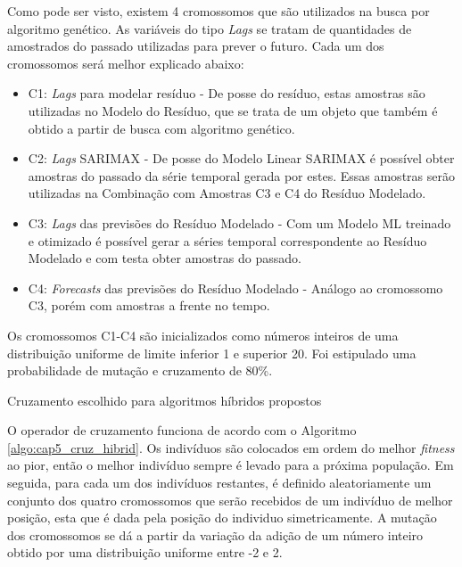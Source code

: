 Como pode ser visto, existem 4 cromossomos que são utilizados na busca por algoritmo genético. As variáveis do tipo \textit{Lags} se tratam de quantidades de amostrados do passado utilizadas para prever o futuro. Cada um dos cromossomos será melhor explicado abaixo:

\begin{itemize}
    \item C1: \textit{Lags} para modelar resíduo - De posse do resíduo, estas amostras são utilizadas no Modelo do Resíduo, que se trata de um objeto que também é obtido a partir de busca com algoritmo genético.
    
    \item C2: \textit{Lags} SARIMAX - De posse do Modelo Linear SARIMAX é possível obter amostras do passado da série temporal gerada por estes. Essas amostras serão utilizadas na Combinação com Amostras C3 e C4 do Resíduo Modelado.
    
    \item C3: \textit{Lags} das previsões do Resíduo Modelado - Com um Modelo ML treinado e otimizado é possível gerar a séries temporal correspondente ao Resíduo Modelado e com testa obter amostras do passado.
    
    \item C4: \textit{Forecasts} das previsões do Resíduo Modelado - Análogo ao cromossomo C3, porém com amostras a frente no tempo.
\end{itemize}

Os cromossomos C1-C4 são inicializados como números inteiros de uma distribuição uniforme de limite inferior 1 e superior 20. Foi estipulado uma probabilidade de mutação e cruzamento de 80\%.

\begin{algorithm}[!htp]
    \caption{Cruzamento escolhido para algoritmos híbridos propostos}
    \label{algo:cap5_cruz_hibrid}
\end{algorithm}

O operador de cruzamento funciona de acordo com o Algoritmo \ref{algo:cap5_cruz_hibrid}. Os indivíduos são colocados em ordem do melhor \textit{fitness} ao pior, então o melhor indivíduo sempre é levado para a próxima população. Em seguida, para cada um dos indivíduos restantes, é definido aleatoriamente um conjunto dos quatro cromossomos que serão recebidos de um indivíduo de melhor posição, esta que é dada pela posição do individuo simetricamente. A mutação dos cromossomos se dá a partir da variação da adição de um número inteiro obtido por uma distribuição uniforme entre -2 e 2.

